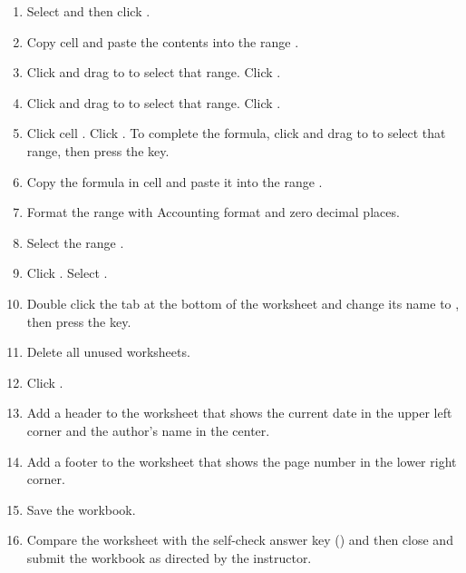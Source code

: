 \begin{enumbox}
\begin{enumerate}
		\item Select  and then click . 
		\item Copy cell  and paste the contents into the range .
		\item Click  and drag to  to select that range. Click .
		\item Click  and drag to  to select that range. Click .
		\item Click cell . Click . To complete the formula, click  and drag to  to select that range, then press the  key.
		\item Copy the formula in cell  and paste it into the range .
		\item Format the range  with Accounting format and zero decimal places.
		\item Select the range .
		\item Click . Select .
		\item Double click the  tab at the bottom of the worksheet and change its name to , then press the  key. 
		\item Delete all unused worksheets.
		\item Click .
		\item Add a header to the  worksheet that shows the current date in the upper left corner and the author's name in the center.
		\item Add a footer to the  worksheet that shows the page number in the lower right corner. 
		\item Save the  workbook.
		\item Compare the worksheet with the self-check answer key () and then close and submit the  workbook as directed by the instructor.
	\end{enumerate}
\end{enumbox}
	

